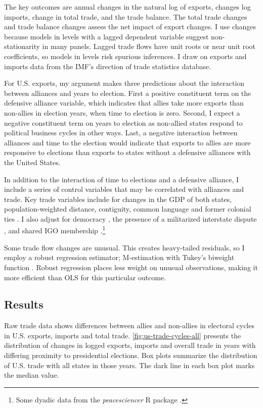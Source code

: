 \documentclass[12pt]{article}
\begin{document}
The key outcomes are annual changes in the natural log of exports, changes log imports, change in total trade, and the trade balance.
The total trade changes and trade balance changes assess the net impact of export changes.
I use changes because models in levels with a lagged dependent variable suggest non-stationarity in many panels. 
Lagged trade flows have unit roots or near unit root coefficients, so models in levels risk spurious inferences.
I draw on exports and imports data from the IMF's direction of trade statistics database.


For U.S. exports, my argument makes three predictions about the interaction between alliances and years to election. 
First a positive constituent term on the defensive alliance variable, which indicates that allies take more exports than non-allies in election years, when time to election is zero.
Second, I expect a negative constituent term on years to election as non-allied states respond to political business cycles in other ways.
Last, a negative interaction between alliances and time to the election would indicate that exports to allies are more responsive to elections than exports to states without a defensive alliances with the United States.


In addition to the interaction of time to elections and a defensive alliance, I include a series of control variables that may be correlated with alliances and trade. 
Key trade variables include for changes in the GDP of both states, population-weighted distance, contiguity, common language and former colonial ties \citep{FouquinHugot2016}.
I also adjust for democracy \citep{Marquez2016}, the presence of a militarized interstate dispute \citep{Gibleretal2016}, and shared IGO membership \citep{Pevehouseetal2020}.\footnote{Some dyadic data from the \textit{peacesciencer} \textsf{R} package \citep{peacesciencer-package}.}


Some trade flow changes are unusual. 
This creates heavy-tailed residuals, so I employ a robust regression estimator; M-estimation with Tukey's biweight function \citep{RaineyBaissa2020}.
Robust regression places less weight on unusual observations, making it more efficient than OLS for this particular outcome.



\subsection{Results}


Raw trade data shows differences between allies and non-allies in electoral cycles in U.S. exports, imports and total trade. 
\autoref{fig:us-trade-cycles-all} presents the distribution of changes in logged exports, imports and overall trade in years with differing proximity to presidential elections.
Box plots summarize the distribution of U.S. trade with all states in those years. 
The dark line in each box plot marks the median value. 
\end{document}
